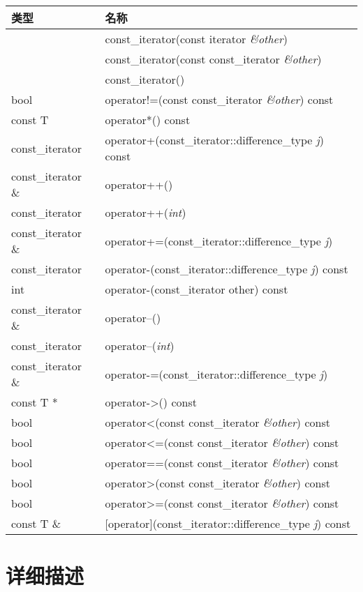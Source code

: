 \begin{longtable}[l]{|l|l|}
\hline
类型 &	名称\\
\hline
    &const\_iterator(const iterator \emph{\&other})\\
\hline
	&const\_iterator(const const\_iterator \emph{\&other})\\
\hline
	&const\_iterator()\\
\hline
bool &	operator!=(const const\_iterator \emph{\&other}) const\\
\hline
const T & 	operator*() const\\
\hline
const\_iterator &	operator+(const\_iterator::difference\_type \emph{j})
                  const\\
\hline
const\_iterator \& &	operator++()\\
\hline
const\_iterator &	operator++(\emph{int})\\
\hline
const\_iterator \& & 	operator+=(const\_iterator::difference\_type
                     \emph{j})\\
\hline
const\_iterator &	operator-(const\_iterator::difference\_type \emph{j})
                  const\\
\hline
int 	&operator-(const\_iterator other) const\\
\hline
const\_iterator \& &	operator--()\\
\hline
const\_iterator 	& operator--(\emph{int})\\
\hline
const\_iterator \& 	& operator-=(const\_iterator::difference\_type \emph{j})\\
const T * &	operator->() const\\
\hline
bool& 	operator<(const const\_iterator \emph{\&other}) const\\
\hline
bool& 	operator<=(const const\_iterator \emph{\&other}) const\\
\hline
bool& 	operator==(const const\_iterator \emph{\&other}) const\\
\hline
bool& 	operator>(const const\_iterator \emph{\&other}) const\\
\hline
bool& 	operator>=(const const\_iterator \emph{\&other}) const\\
\hline
const T \& &	[operator](const\_iterator::difference\_type \emph{j}) const\\
\hline
\end{longtable}


\section{详细描述}

